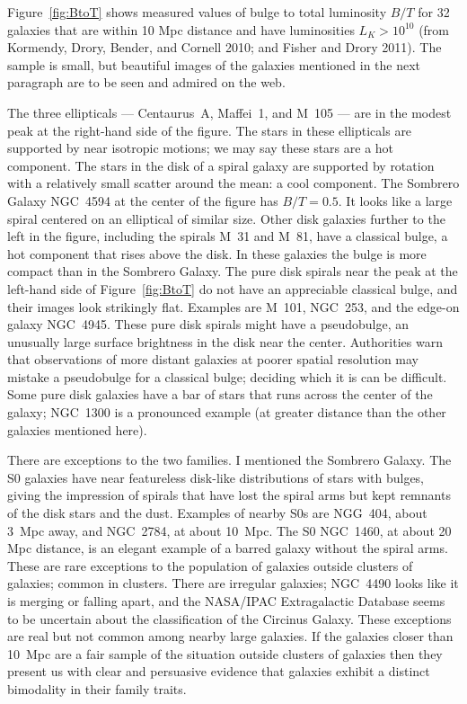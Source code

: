 \documentclass[fleqn,12pt]{article}
\begin{document}
Figure~\ref{fig:BtoT} shows measured values of bulge to total luminosity $B/T$ for 32 galaxies that are within 10 Mpc distance and have luminosities $L_K > 10^{10}$ (from Kormendy, Drory, Bender, and Cornell 2010; and Fisher and Drory 2011). The sample is small, but beautiful images of the galaxies mentioned in the next paragraph are to be seen and admired on the web. 

The three ellipticals --- Centaurus~A, Maffei~1, and M~105 --- are in the modest peak at the right-hand side of the figure. The stars in these ellipticals are supported by near isotropic motions; we may say these stars are a hot component. The stars in the disk of a spiral galaxy are supported by rotation with a relatively small scatter around the mean: a cool component. The Sombrero Galaxy NGC~4594 at the center of the figure has $B/T=0.5$. It looks like a large spiral centered on an elliptical of similar size. Other disk galaxies further to the left in the figure, including the spirals M~31 and M~81, have a classical bulge, a hot component that rises above the disk. In these galaxies the bulge is more compact than in the Sombrero Galaxy. The pure disk spirals near the peak at the left-hand side of Figure~\ref{fig:BtoT} do not have an appreciable classical bulge, and their images look strikingly flat. Examples are M~101, NGC~253, and the edge-on galaxy NGC~4945. These pure disk spirals might have a pseudobulge, an unusually large surface brightness in the disk near the center. Authorities warn that observations of more distant galaxies at poorer spatial resolution may mistake a pseudobulge for a classical bulge; deciding which it is can be difficult. Some pure disk galaxies have a bar of stars that runs across the center of the galaxy; NGC~1300 is a pronounced example (at greater distance than the other galaxies mentioned here). 

There are exceptions to the two families. I mentioned the Sombrero Galaxy. The S0 galaxies have near featureless disk-like distributions of stars with bulges, 
giving the impression of spirals that have lost the spiral arms but kept remnants of the disk stars and the dust. Examples of nearby S0s are NGG~404, about 3~Mpc away, and NGC~2784, at about 10~Mpc. The S0 NGC~1460, at about 20 Mpc distance, is an elegant example of a barred galaxy without the spiral arms. These are rare exceptions to the population of galaxies outside clusters of galaxies; common in clusters. There are irregular galaxies; NGC~4490 looks like it is merging or falling apart, and the NASA/IPAC Extragalactic Database seems to be uncertain about the classification of the Circinus Galaxy. These exceptions are real but not common among nearby large galaxies. If the galaxies closer than 10~Mpc are a fair sample of the situation outside clusters of galaxies then they present us with clear and persuasive evidence that galaxies exhibit a distinct bimodality in their family traits.
\end{document}

